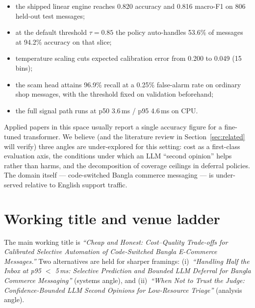\documentclass[11pt]{article}
\begin{document}
\begin{itemize}[leftmargin=*,itemsep=1pt,topsep=3pt]
      \item the shipped linear engine reaches 0.820 accuracy and 0.816 macro-F1
      on 806 held-out test messages;
      \item at the default threshold $\tau=0.85$ the policy auto-handles 53.6\%
      of messages at 94.2\% accuracy on that slice;
      \item temperature scaling cuts expected calibration error from 0.200 to
      0.049 (15 bins);
      \item the scam head attains 96.9\% recall at a 0.25\% false-alarm rate on
      ordinary shop messages, with the threshold fixed on validation beforehand;
      \item the full signal path runs at p50 3.6\,ms / p95 4.6\,ms on CPU.
\end{itemize}

Applied papers in this space usually report a single accuracy figure for a
fine-tuned transformer. We believe (and the literature review in
Section~\ref{sec:related} will verify) three angles are under-explored for this
setting: cost as a first-class evaluation axis, the conditions under which an
LLM ``second opinion'' helps rather than harms, and the decomposition of
coverage ceilings in deferral policies. The domain itself --- code-switched
Bangla commerce messaging --- is under-served relative to English support
traffic.

\section{Working title and venue ladder}
The main working title is \emph{``Cheap and Honest: Cost--Quality Trade-offs
for Calibrated Selective Automation of Code-Switched Bangla E-Commerce
Messages.''} Two alternatives are held for sharper framings:
(i)~\emph{``Handling Half the Inbox at p95 $<$ 5\,ms: Selective Prediction and
Bounded LLM Deferral for Bangla Commerce Messaging''} (systems angle), and
(ii)~\emph{``When Not to Trust the Judge: Confidence-Bounded LLM Second
Opinions for Low-Resource Triage''} (analysis angle).
\end{document}
